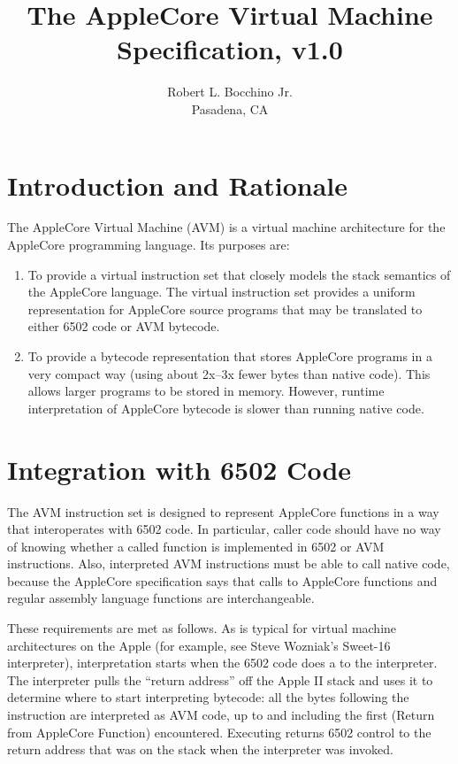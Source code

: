 \documentclass[10pt]{article}
\title{\bfseries{The AppleCore Virtual Machine Specification, v1.0}}
\author{Robert L. Bocchino Jr.\\
Pasadena, CA}
\begin{document}
\maketitle

\tableofcontents

\section{Introduction and Rationale}

The AppleCore Virtual Machine (AVM) is a virtual machine architecture
for the AppleCore programming language.  Its purposes are:
%
\begin{enumerate}
%
\item To provide a virtual instruction set that closely models the
  stack semantics of the AppleCore language.  The virtual instruction
  set provides a uniform representation for AppleCore source programs
  that may be translated to either 6502 code or AVM bytecode.
%
\item To provide a bytecode representation that stores AppleCore
  programs in a very compact way (using about 2x--3x fewer bytes than
  native code).  This allows larger programs to be stored in memory.
  However, runtime interpretation of AppleCore bytecode is slower than
  running native code.
%
\end{enumerate}

\section{Integration with 6502 Code}

The AVM instruction set is designed to represent AppleCore functions
in a way that interoperates with 6502 code.  In particular, caller
code should have no way of knowing whether a called function is
implemented in 6502 or AVM instructions.  Also, interpreted AVM
instructions must be able to call native code, because the AppleCore
specification says that calls to AppleCore functions and regular
assembly language functions are interchangeable.

These requirements are met as follows.  As is typical for virtual machine
architectures on the Apple (for example, see Steve Wozniak's Sweet-16
interpreter), interpretation starts when the 6502 code does a
 to the interpreter.  The interpreter pulls the ``return
address'' off the Apple II stack and uses it to determine where to start
interpreting bytecode: all the bytes following the 
instruction are interpreted as AVM code, up to and including the first
 (Return from AppleCore Function) encountered.
Executing  returns 6502 control to the return
address that was on the stack when the interpreter was
invoked.
\end{document}
